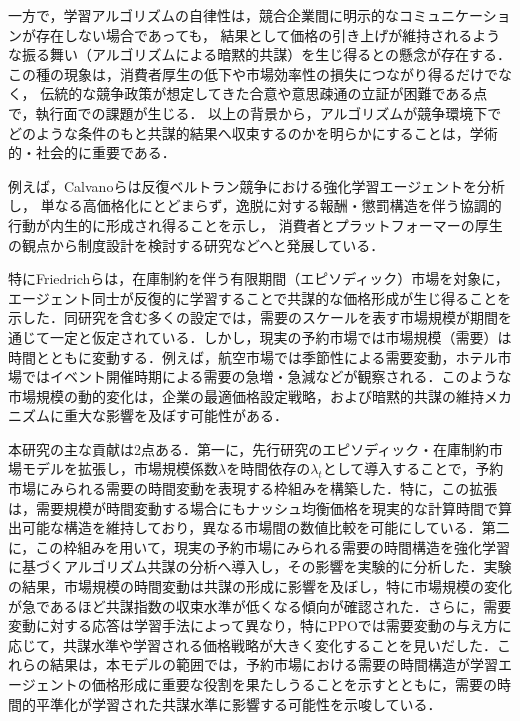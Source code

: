 \documentclass[runningheads]{llncs}
\begin{document}
一方で，学習アルゴリズムの自律性は，競合企業間に明示的なコミュニケーションが存在しない場合であっても，
結果として価格の引き上げが維持されるような振る舞い（アルゴリズムによる暗黙的共謀）を生じ得るとの懸念が存在する\cite{mehra2016,ezrachi2017}．
この種の現象は，消費者厚生の低下や市場効率性の損失につながり得るだけでなく，
伝統的な競争政策が想定してきた合意や意思疎通の立証が困難である点で，執行面での課題が生じる\cite{harrington2019}．
以上の背景から，アルゴリズムが競争環境下でどのような条件のもと共謀的結果へ収束するのかを明らかにすることは，学術的・社会的に重要である．

例えば，Calvanoら\cite{calvano2020a}は反復ベルトラン競争における強化学習エージェントを分析し，
単なる高価格化にとどまらず，逸脱に対する報酬・懲罰構造を伴う協調的行動が内生的に形成され得ることを示し，
消費者とプラットフォーマーの厚生の観点から制度設計を検討する研究などへと発展している\cite{johnson2020}．

特にFriedrichらは，在庫制約を伴う有限期間（エピソディック）市場を対象に，エージェント同士が反復的に学習することで共謀的な価格形成が生じ得ることを示した\cite{friedrich2025learning}．同研究を含む多くの設定では，需要のスケールを表す市場規模が期間を通じて一定と仮定されている．しかし，現実の予約市場では市場規模（需要）は時間とともに変動する．例えば，航空市場では季節性による需要変動，ホテル市場ではイベント開催時期による需要の急増・急減などが観察される．このような市場規模の動的変化は，企業の最適価格設定戦略，および暗黙的共謀の維持メカニズムに重大な影響を及ぼす可能性がある．

本研究の主な貢献は2点ある．第一に，先行研究のエピソディック・在庫制約市場モデルを拡張し，市場規模係数$\lambda$を時間依存の$\lambda_t$として導入することで，予約市場にみられる需要の時間変動を表現する枠組みを構築した．特に，この拡張は，需要規模が時間変動する場合にもナッシュ均衡価格を現実的な計算時間で算出可能な構造を維持しており，異なる市場間の数値比較を可能にしている．第二に，この枠組みを用いて，現実の予約市場にみられる需要の時間構造を強化学習に基づくアルゴリズム共謀の分析へ導入し，その影響を実験的に分析した．実験の結果，市場規模の時間変動は共謀の形成に影響を及ぼし，特に市場規模の変化が急であるほど共謀指数の収束水準が低くなる傾向が確認された．さらに，需要変動に対する応答は学習手法によって異なり，特にPPOでは需要変動の与え方に応じて，共謀水準や学習される価格戦略が大きく変化することを見いだした．これらの結果は，本モデルの範囲では，予約市場における需要の時間構造が学習エージェントの価格形成に重要な役割を果たしうることを示すとともに，需要の時間的平準化が学習された共謀水準に影響する可能性を示唆している．
\end{document}
